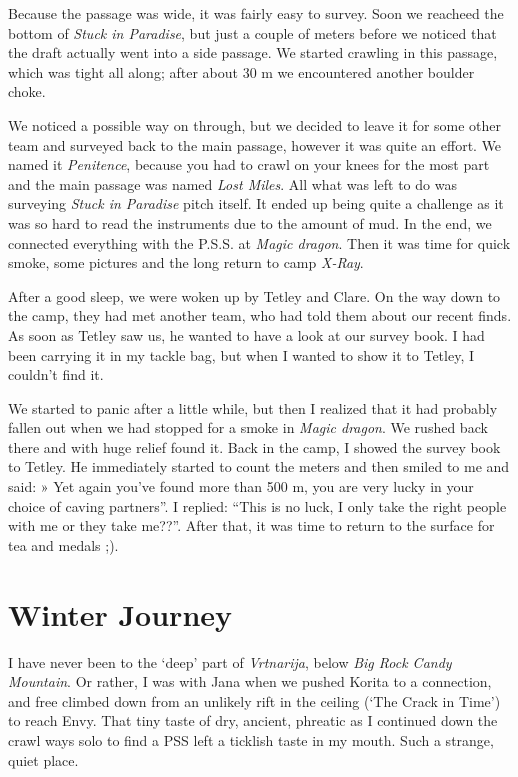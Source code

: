 Because the passage was wide, it was fairly easy to survey. Soon we
reacheed the bottom of \emph{Stuck in Paradise}, but just a couple of
meters before we noticed that the draft actually went into a side
passage. We started crawling in this passage, which was tight all along;
after about 30 m we encountered another boulder choke.

We noticed a possible way on through, but we decided to leave it for
some other team and surveyed back to the main passage, however it was
quite an effort. We named it \emph{Penitence}, because you had to crawl
on your knees for the most part and the main passage was named
\emph{Lost Miles}. All what was left to do was surveying \emph{Stuck in
Paradise} pitch itself. It ended up being quite a challenge as it was so
hard to read the instruments due to the amount of mud. In the end, we
connected everything with the P.S.S. at \emph{Magic dragon}. Then it was
time for quick smoke, some pictures and the long return to camp
\emph{X-Ray}.

After a good sleep, we were woken up by Tetley and Clare. On the way
down to the camp, they had met another team, who had told them about our
recent finds. As soon as Tetley saw us, he wanted to have a look at our
survey book. I had been carrying it in my tackle bag, but when I wanted
to show it to Tetley, I couldn't find it.

We started to panic after a little while, but then I realized that it
had probably fallen out when we had stopped for a smoke in \emph{Magic
dragon}. We rushed back there and with huge relief found it. Back in the
camp, I showed the survey book to Tetley. He immediately started to
count the meters and then smiled to me and said: » Yet again you've
found more than 500 m, you are very lucky in your choice of caving
partners''. I replied: ``This is no luck, I only take the right people
with me or they take me??''. After that, it was time to return to the
surface for tea and medals ;).

\attrib{\izi}

\hypertarget{winter-journey}{%
\section{Winter Journey}\label{winter-journey}}

I have never been to the `deep' part of \emph{Vrtnarija}, below
\emph{Big Rock Candy Mountain}. Or rather, I was with Jana when we
pushed Korita to a connection, and free climbed down from an unlikely
rift in the ceiling (`The Crack in Time') to reach Envy. That tiny taste
of dry, ancient, phreatic as I continued down the crawl ways solo to
find a PSS left a ticklish taste in my mouth. Such a strange, quiet
place.

